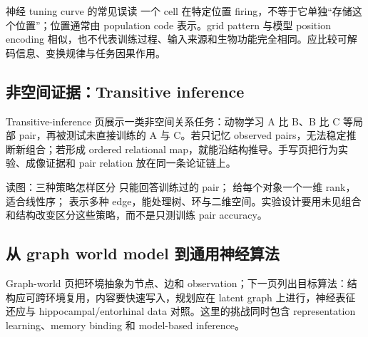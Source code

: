 

\begin{warningbox}{神经 tuning curve 的常见误读}
一个 cell 在特定位置 firing，不等于它单独“存储这个位置”；位置通常由 population code 表示。grid pattern 与模型 position encoding 相似，也不代表训练过程、输入来源和生物功能完全相同。应比较可解码信息、变换规律与任务因果作用。
\end{warningbox}

\subsection{非空间证据：Transitive inference}

Transitive-inference 页展示一类非空间关系任务：动物学习 A 比 B、B 比 C 等局部 pair，再被测试未直接训练的 A 与 C。若只记忆 observed pairs，无法稳定推断新组合；若形成 ordered relational map，就能沿结构推导。手写页把行为实验、成像证据和 pair relation 放在同一条论证链上。



\begin{knowledgebox}{读图：三种策略怎样区分}
 只能回答训练过的 pair； 给每个对象一个一维 rank，适合线性序； 表示多种 edge，能处理树、环与二维空间。实验设计要用未见组合和结构改变区分这些策略，而不是只测训练 pair accuracy。
\end{knowledgebox}

\subsection{从 graph world model 到通用神经算法}

Graph-world 页把环境抽象为节点、边和 observation；下一页列出目标算法：结构应可跨环境复用，内容要快速写入，规划应在 latent graph 上进行，神经表征还应与 hippocampal/entorhinal data 对照。这里的挑战同时包含 representation learning、memory binding 和 model-based inference。

